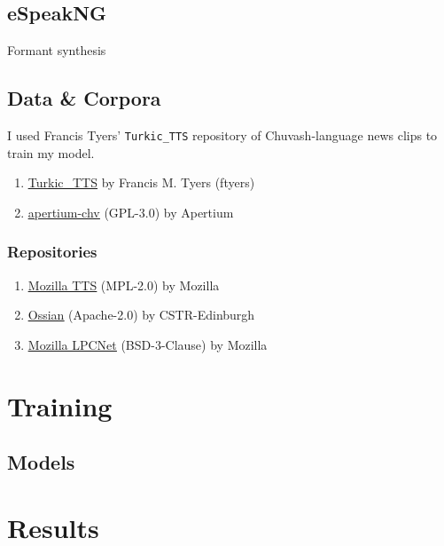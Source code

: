 \documentclass[11pt,a4paper]{article}
\begin{document}
\subsection{eSpeakNG}\label{ssec:espeak}
Formant synthesis

\subsection{Data \& Corpora}\label{ssec:data}
I used Francis Tyers' \texttt{Turkic\_TTS} repository of Chuvash-language news clips to train my model.

\begin{enumerate}
	\item \href{https://github.com/ftyers/Turkic_TTS}{\underline{Turkic\_TTS}} by Francis M. Tyers (ftyers)
	\item \href{https://github.com/apertium/apertium-chv}{\underline{apertium-chv}} (GPL-3.0) by Apertium
\end{enumerate}

\subsubsection{Repositories} %
\begin{enumerate}
	\item \href{https://github.com/mozilla/TTS}{\underline{Mozilla TTS}} (MPL-2.0) by Mozilla
	\item \href{https://github.com/CSTR-Edinburgh/Ossian}{\underline{Ossian}} (Apache-2.0) by CSTR-Edinburgh
	\item \href{https://github.com/mozilla/LPCNet}{\underline{Mozilla LPCNet}} (BSD-3-Clause) by Mozilla
	
\end{enumerate}

\section{Training}


\subsection{Models}\label{ssec:models}


\section{Results}\label{sect:results}
\end{document}
